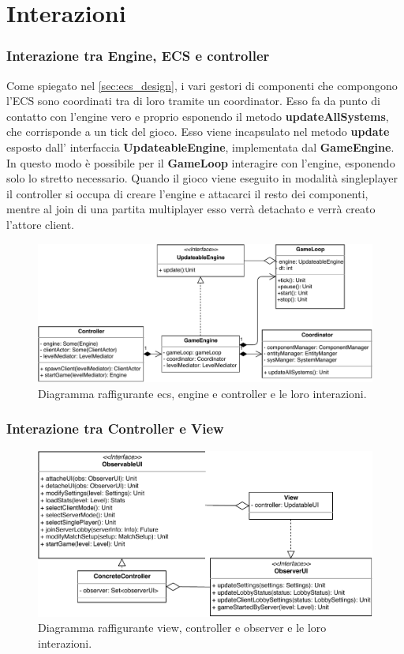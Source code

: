 \section{Interazioni}
\label{sec:interactions_design}

\subsubsection{Interazione tra Engine, ECS e controller}
Come spiegato nel \ref{sec:ecs_design}, i vari gestori di componenti che compongono l'ECS sono coordinati tra di loro tramite un coordinator. Esso fa da punto di contatto con l'engine vero e proprio esponendo il metodo \textbf{updateAllSystems}, che corrisponde a un tick del gioco. Esso viene incapsulato nel metodo \textbf{update} esposto dall' interfaccia \textbf{UpdateableEngine}, implementata dal \textbf{GameEngine}. In questo modo è possibile per il \textbf{GameLoop} interagire con l'engine, esponendo solo lo stretto necessario.
Quando il gioco viene eseguito in modalità singleplayer il controller si occupa di creare l'engine e attacarci il resto dei componenti, mentre al join di una partita multiplayer esso verrà detachato e verrà creato l'attore client.
\begin{figure}[H]
	\centering
	\includegraphics[width=\columnwidth]{drawio/ECS-engine-controller/ecs-engine-controller.pdf}
	\caption{Diagramma raffigurante ecs, engine e controller e le loro interazioni.}
	\label{fig:ecs-engine-controller}
\end{figure}



\subsubsection{Interazione tra Controller e View}



\begin{figure}[H]
	\centering
	\includegraphics[width=\columnwidth]{drawio/view-controller-observer/view-controller-observer.pdf}
	\caption{Diagramma raffigurante view, controller e observer e le loro interazioni.}
	\label{fig:view-controller-observer}
\end{figure}